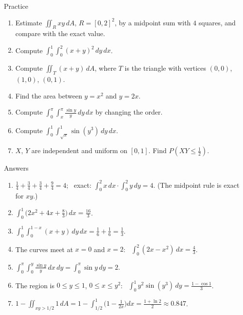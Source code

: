 \documentclass[10pt]{wosm-slides}
\newcommand{\dA}{\, dA}
\begin{document}
\begin{frame}{Practice}
  \small
  \begin{enumerate}
    \item Estimate $\iint_R xy \dA$, $R = [0, 2]^2$, by a midpoint sum with $4$ squares, and compare
      with the exact value.
    \item Compute $\int_0^1 \int_0^2 (x + y)^2\, dy\, dx$.
    \item Compute $\iint_T (x + y) \dA$, where $T$ is the triangle with vertices $(0, 0)$, $(1, 0)$,
      $(0, 1)$.
    \item Find the area between $y = x^2$ and $y = 2x$.
    \item Compute $\displaystyle \int_0^\pi \int_x^\pi \frac{\sin y}{y}\, dy\, dx$ by changing the order.
    \item Compute $\displaystyle \int_0^1 \int_{\sqrt x}^1 \sin(y^3)\, dy\, dx$.
    \item $X$, $Y$ are independent and uniform on $[0, 1]$. Find $P(XY \le \frac12)$.
  \end{enumerate}
\end{frame}

\begin{frame}{Answers}
  \small
  \begin{enumerate}
    \item $\frac14 + \frac34 + \frac34 + \frac94 = 4$; \ exact: $\int_0^2 x\,dx \cdot \int_0^2 y\,dy = 4$.
      (The midpoint rule is exact for $xy$.)
    \item $\int_0^1 \bigl(2x^2 + 4x + \frac83\bigr)\, dx = \frac{16}{3}$.
    \item $\int_0^1 \int_0^{1-x} (x + y)\, dy\, dx = \frac16 + \frac16 = \frac13$.
    \item The curves meet at $x = 0$ and $x = 2$: \ $\int_0^2 (2x - x^2)\, dx = \frac43$.
    \item $\int_0^\pi \int_0^y \frac{\sin y}{y}\, dx\, dy = \int_0^\pi \sin y\, dy = 2$.
    \item The region is $0 \le y \le 1$, $0 \le x \le y^2$: \ $\int_0^1 y^2 \sin(y^3)\, dy = \frac{1 - \cos 1}{3}$.
    \item $1 - \iint_{xy > 1/2} 1 \dA = 1 - \int_{1/2}^1 \bigl(1 - \frac{1}{2x}\bigr) dx = \frac{1 + \ln 2}{2} \approx 0.847$.
  \end{enumerate}
\end{frame}
\end{document}
